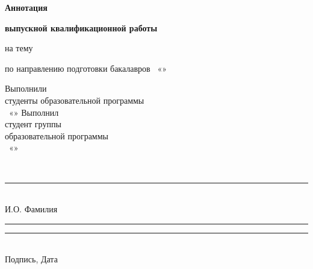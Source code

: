 \begin{titlepage}
\vspace{0.95cm}
\begin{center}
\textbf{\normalsize Аннотация}

\vspace{0.12cm}
\textbf{\normalsize выпускной квалификационной работы}

\vspace{0.35cm}
на тему
\underline{\makebox[0.72\textwidth][c]{\hseProjectName}}

\vspace{0.3cm}
по направлению подготовки бакалавров \hseProgramCode\ «\hseSpecialization»
\end{center}

\vspace{0.95cm}
\noindent\hfill
\begin{minipage}[t]{0.52\textwidth}
\raggedright
\ifhseSharedDoc
Выполнили\\
студенты образовательной программы\\
\hseProgramCode\ «\hseSpecialization»
\hseForEachAuthor{\hseAnnotationAuthorRow}
\else
Выполнил\\
студент группы \hseGroup\\
образовательной программы\\
\hseProgramCode\ «\hseSpecialization»

\vspace{0.25cm}
\strut\hseAuthorName\\[-0.05cm]
\rule{6cm}{0.4pt}\\[-0.05cm]
{\scriptsize И.О. Фамилия}

\vspace{0.15cm}
\rule{3.6cm}{0.4pt}\quad\rule{2.2cm}{0.4pt}\\[-0.05cm]
{\scriptsize Подпись, Дата}
\fi
\end{minipage}

\vfill
\begin{center}
\textbf{\hseCity{} \hseYear}
\end{center}
\end{titlepage}
\clearpage
